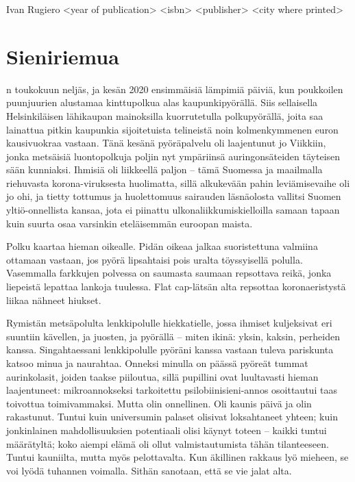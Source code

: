 \documentclass{tsnovel}
\begin{document}
        {Ivan Rugiero}
        {<year of publication>}
        {<isbn>}
        {<publisher>}
        {<city where printed>}

\chapter{Sieniriemua}

n toukokuun neljäs, ja kesän 2020 ensimmäisiä lämpimiä päiviä, kun poukkoilen puunjuurien alustamaa kinttupolkua alas kaupunkipyörällä. Siis sellaisella Helsinkiläisen lähikaupan mainoksilla kuorrutetulla polkupyörällä, joita saa lainattua pitkin kaupunkia sijoitetuista telineistä noin kolmenkymmenen euron kausivuokraa vastaan. Tänä kesänä pyöräpalvelu oli laajentunut jo Viikkiin, jonka metsäisiä luontopolkuja poljin nyt ympäriinsä auringonsäteiden täyteisen sään kunniaksi. Ihmisiä oli liikkeellä paljon – tämä Suomessa ja maailmalla riehuvasta korona-viruksesta huolimatta, sillä alkukevään pahin leviämisevaihe oli jo ohi, ja tietty tottumus ja huolettomuus  sairauden läsnäolosta vallitsi Suomen yltiö-onnellista kansaa, jota ei piinattu ulkonaliikkumiskielloilla samaan tapaan kuin suurta osaa varsinkin eteläisemmän euroopan maista.

Polku kaartaa hieman oikealle. Pidän oikeaa jalkaa suoristettuna valmiina ottamaan vastaan, jos pyörä lipsahtaisi pois uralta töyssyisellä polulla. Vasemmalla farkkujen polvessa on saumasta saumaan repsottava reikä, jonka liepeistä lepattaa lankoja tuulessa. Flat cap-lätsän alta repsottaa koronaeristystä liikaa nähneet hiukset.

Rymistän metsäpolulta lenkkipolulle hiekkatielle, jossa ihmiset kuljeksivat eri suuntiin  kävellen, ja juosten, ja pyörällä – miten ikinä: yksin, kaksin, perheiden kanssa. Singahtaessani lenkkipolulle pyöräni kanssa vastaan tuleva pariskunta katsoo minua ja naurahtaa. Onneksi minulla on päässä pyöreät tummat aurinkolasit, joiden taakse piiloutua, sillä pupillini ovat luultavasti hieman laajentuneet:  mikroannokseksi tarkoitettu psilobiinisieni-annos osoittautui taas toivottua toimivammaksi. Mutta olin onnellinen. Oli kaunis päivä ja olin rakastunut. Tuntui kuin universumin palaset olisivat loksahtaneet yhteen; kuin jonkinlainen mahdollisuuksien potentiaali olisi käynyt toteen – kaikki tuntui määrätyltä; koko aiempi elämä oli ollut valmistautumista tähän tilanteeseen. Tuntui kauniilta, mutta myös pelottavalta. Kun äkillinen rakkaus lyö mieheen, se voi lyödä tuhannen voimalla.  Sithän sanotaan, että se vie jalat alta.
\end{document}
